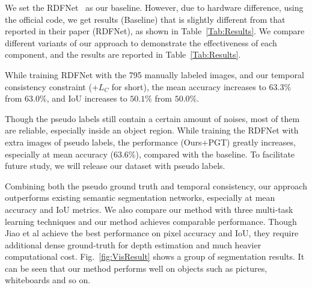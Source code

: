 We set the RDFNet~\cite{Park2017} as our baseline. 
However, due to hardware difference, using the official code, we get results (Baseline) that is slightly different from that reported in their paper (RDFNet), as shown in Table~\ref{Tab:Results}. 
We compare different variants of our approach to demonstrate the effectiveness of each component, and the results are reported in Table~\ref{Tab:Results}. 

 While training RDFNet with the 795 manually labeled images, and our temporal consistency constraint (+$L_C$ for short), the mean accuracy increases to $63.3\%$ from $63.0\%$, and IoU increases to $50.1\%$ from $50.0\%$.


Though the pseudo labels still contain a certain amount of noises, most of them are reliable, especially inside an object region. 
%
While training the RDFNet with extra images of pseudo labels, the performance (Ours+PGT) greatly increases, especially at mean accuracy ($63.6\%$), compared with the baseline.
%
To facilitate future study, we will release our dataset with pseudo labels.
%

Combining both the pseudo ground truth and temporal consistency, our approach outperforms existing semantic segmentation networks, especially at mean accuracy and IoU metrics. 
We also compare our method with three multi-task learning techniques and our method achieves comparable performance.
%
Though Jiao et al achieve the best performance on pixel accuracy and IoU, they require additional dense ground-truth for depth estimation and much heavier computational cost.
%
Fig.~\ref{fig:VisResult} shows a group of segmentation results. It can be seen that our method performs well on objects such as pictures, whiteboards and so on. 
%




